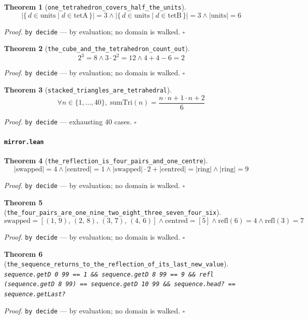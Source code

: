 \documentclass[11pt]{article}
\newtheorem{theorem}{Theorem}[section]
\begin{document}
\begin{theorem}[\texttt{one\_tetrahedron\_covers\_half\_the\_units}]
\[ \left|\{\, d \in \mathrm{units} \mid d \in \mathrm{tetA} \,\}\right| = 3 \land \left|\{\, d \in \mathrm{units} \mid d \in \mathrm{tetB} \,\}\right| = 3 \land \left|\mathrm{units}\right| = 6 \]
\end{theorem}
\noindent\emph{Proof.} \texttt{by decide} --- by evaluation; no domain is walked. \hfill$\square$

\begin{theorem}[\texttt{the\_cube\_and\_the\_tetrahedron\_count\_out}]
\[ 2^{3} = 8 \land 3 \cdot 2^{2} = 12 \land 4 + 4 - 6 = 2 \]
\end{theorem}
\noindent\emph{Proof.} \texttt{by decide} --- by evaluation; no domain is walked. \hfill$\square$

\begin{theorem}[\texttt{stacked\_triangles\_are\_tetrahedral}]
\[ \forall n \in \{1,\dots,40\},\; \mathrm{sumTri}\mathopen{}\left(n\right) = \frac{n \cdot n + 1 \cdot n + 2}{6} \]
\end{theorem}
\noindent\emph{Proof.} \texttt{by decide} --- exhausting 40 cases. \hfill$\square$

\paragraph{\texttt{mirror.lean}}

\begin{theorem}[\texttt{the\_reflection\_is\_four\_pairs\_and\_one\_centre}]
\[ \left|\mathrm{swapped}\right| = 4 \land \left|\mathrm{centred}\right| = 1 \land \left|\mathrm{swapped}\right| \cdot 2 + \left|\mathrm{centred}\right| = \left|\mathrm{ring}\right| \land \left|\mathrm{ring}\right| = 9 \]
\end{theorem}
\noindent\emph{Proof.} \texttt{by decide} --- by evaluation; no domain is walked. \hfill$\square$

\begin{theorem}[\texttt{the\_four\_pairs\_are\_one\_nine\_two\_eight\_three\_seven\_four\_six}]
\[ \mathrm{swapped} = [\left(1,\,9\right),\,\left(2,\,8\right),\,\left(3,\,7\right),\,\left(4,\,6\right)] \land \mathrm{centred} = [5] \land \mathrm{refl}\mathopen{}\left(6\right) = 4 \land \mathrm{refl}\mathopen{}\left(3\right) = 7 \]
\end{theorem}
\noindent\emph{Proof.} \texttt{by decide} --- by evaluation; no domain is walked. \hfill$\square$

\begin{theorem}[\texttt{the\_sequence\_returns\_to\_the\_reflection\_of\_its\_last\_new\_value}]
\texttt{sequence.getD 0 99 == 1 \&\& sequence.getD 8 99 == 9 \&\& refl (sequence.getD 8 99) == sequence.getD 10 99 \&\& sequence.head? == sequence.getLast?}
\end{theorem}
\noindent\emph{Proof.} \texttt{by decide} --- by evaluation; no domain is walked. \hfill$\square$
\end{document}
